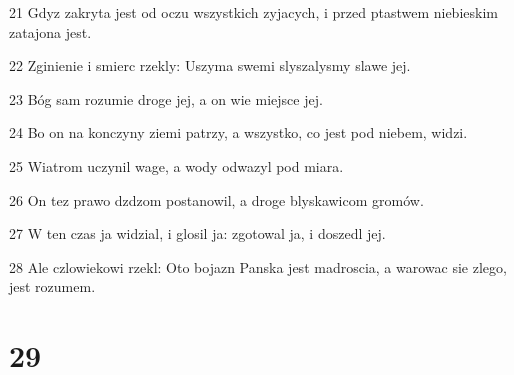 \par 21 Gdyz zakryta jest od oczu wszystkich zyjacych, i przed ptastwem niebieskim zatajona jest.
\par 22 Zginienie i smierc rzekly: Uszyma swemi slyszalysmy slawe jej.
\par 23 Bóg sam rozumie droge jej, a on wie miejsce jej.
\par 24 Bo on na konczyny ziemi patrzy, a wszystko, co jest pod niebem, widzi.
\par 25 Wiatrom uczynil wage, a wody odwazyl pod miara.
\par 26 On tez prawo dzdzom postanowil, a droge blyskawicom gromów.
\par 27 W ten czas ja widzial, i glosil ja: zgotowal ja, i doszedl jej.
\par 28 Ale czlowiekowi rzekl: Oto bojazn Panska jest madroscia, a warowac sie zlego, jest rozumem.

\chapter{29}


